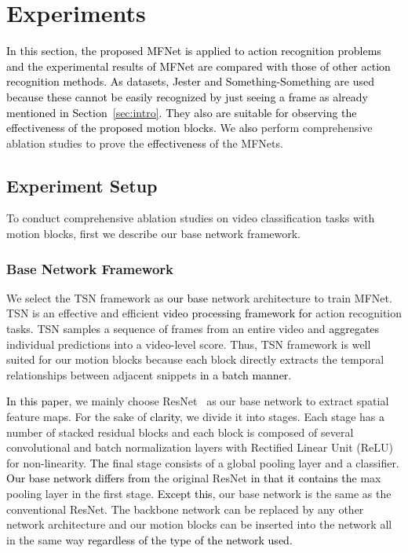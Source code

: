 \documentclass[runningheads]{llncs}
\newcommand{\nj}[1]{\textcolor{black}{#1}}
\newcommand{\mg}[1]{\textcolor{black}{#1}}
\begin{document}
\section{Experiments}
\label{sec:exp}
\nj{In this section, the proposed MFNet is applied to action recognition problems and the experimental results of MFNet are compared with those of other action recognition methods. As datasets, Jester \cite{dataset_jester} and Something-Something \cite{goyal2017something} are used because these cannot be easily recognized by just seeing a frame as already mentioned in Section~\ref{sec:intro}. \nj{They also are} suitable \nj{for observing} the effectiveness of the proposed motion blocks. 
}
We \nj{also} perform comprehensive ablation studies to prove the \nj{effectiveness} of the MFNets.

\subsection{Experiment Setup}
\label{sec:expsetup}

To conduct comprehensive ablation studies on video classification tasks with motion blocks, first we describe our base network framework.


\subsubsection{Base Network Framework}
We select the TSN framework \cite{wang2016temporal} as \nj{our base} network architecture to train MFNet. TSN is an effective and efficient \nj{video processing framework for} action recognition tasks. TSN samples a sequence of frames from an entire video and \nj{aggregates} individual predictions into a video-level score. Thus, TSN framework is well suited for our motion blocks because each block directly extracts the temporal relationships between adjacent snippets \nj{in a batch manner}. 

\mg{In this paper}, we mainly choose ResNet~\cite{he2016deep} as our base network to extract spatial feature maps. For the sake of \nj{clarity}, we divide it into  stages. Each stage has \nj{a} number of stacked residual blocks and each block is composed of several convolutional and batch normalization \cite{ioffe2015batch} layers with Rectified Linear Unit (ReLU) \cite{nair2010rectified} for non-linearity. \nj{The} final stage consists of a global pooling layer and a classifier. \nj{Our base network differs from} the original ResNet \nj{in that it contains the} max pooling layer in the first stage. \nj{Except this,} our base network is the same as the conventional ResNet. The backbone network can be replaced by any other network architecture and our motion blocks can be inserted into the network all in the same way \nj{regardless of the type of the network used.} 
\end{document}
